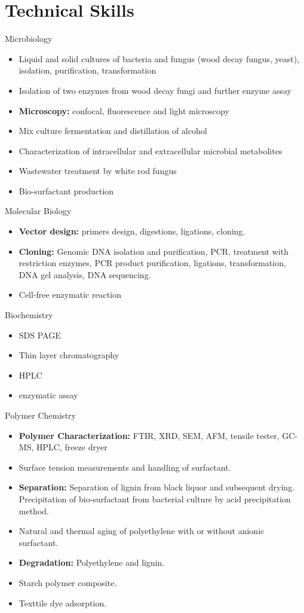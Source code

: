 \documentclass[]{friggeri-cv}
\begin{document}
\newpage
\section{Technical Skills}
\begin{entrylist}
\entry
	{Microbiology}
	{}
	{}
	{\begin{itemize}
	\item Liquid and solid cultures of bacteria and fungus (wood decay fungus, yeast), isolation, purification, transformation \item Isolation of two enzymes from wood decay fungi and further enzyme assay \item \textbf{Microscopy:} confocal, fluorescence and light microscopy \item Mix culture fermentation and distillation of alcohol \item Characterization of intracellular and extracellular microbial metabolites \item Wastewater treatment by white rod fungus \item Bio-surfactant production
	\end{itemize}}
	
\entry
	{Molecular Biology}
	{}
	{}
	{\begin{itemize} \item \textbf{Vector design:} primers design, digestions, ligations, cloning. \item \textbf{Cloning:} Genomic DNA isolation and purification, PCR, treatment with restriction enzymes, PCR product purification, ligations, transformation, DNA gel analysis, DNA sequencing. \item Cell-free enzymatic reaction
	\end{itemize}}
	
\entry
	{Biochemistry}
	{}
	{}
	{\begin{itemize} \item SDS PAGE \item Thin layer chromatography \item HPLC \item enzymatic assay
	\end{itemize}}
	
\entry
	{Polymer Chemistry}
	{}
	{}
	{\begin{itemize} \item \textbf{Polymer Characterization:} FTIR, XRD, SEM, AFM, tensile tester, GC-MS, HPLC, freeze dryer \item Surface tension measurements and handling of surfactant. \item \textbf{Separation:} Separation of lignin from black liquor and subsequent drying. Precipitation of bio-surfactant from bacterial culture by acid precipitation method. \item Natural and thermal aging of polyethylene with or without anionic surfactant. \item \textbf{Degradation:} Polyethylene and lignin. \item Starch polymer composite. \item Texttile dye adsorption.
	\end{itemize}}
	

\end{entrylist}
\end{document}
